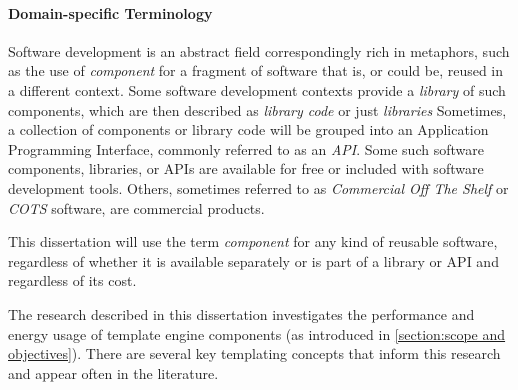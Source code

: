 \paragraph{Domain-specific Terminology}

Software development is an abstract field correspondingly rich in metaphors, such as the use of \emph{component} for a fragment of software that is, or could be, reused in a different context. Some software development contexts provide a \emph{library} of such components, which are then described as \emph{library code} or just \emph{libraries} Sometimes, a collection of components or library code will be grouped into an Application Programming Interface, commonly referred to as an \emph{API}. Some such software components, libraries, or APIs are available for free or included with software development tools. Others, sometimes referred to as \emph{Commercial Off The Shelf} or \emph{COTS} software, are commercial products.

\begin{leftbar}
This dissertation will use the term \emph{component} for any kind of reusable software, regardless of whether it is available separately or is part of a library or API and regardless of its cost.
\end{leftbar}


The research described in this dissertation investigates the performance and energy usage of \gls{template engine} components (as introduced in \autoref{section:scope and objectives}). There are several key templating concepts that inform this research and appear often in the literature.

